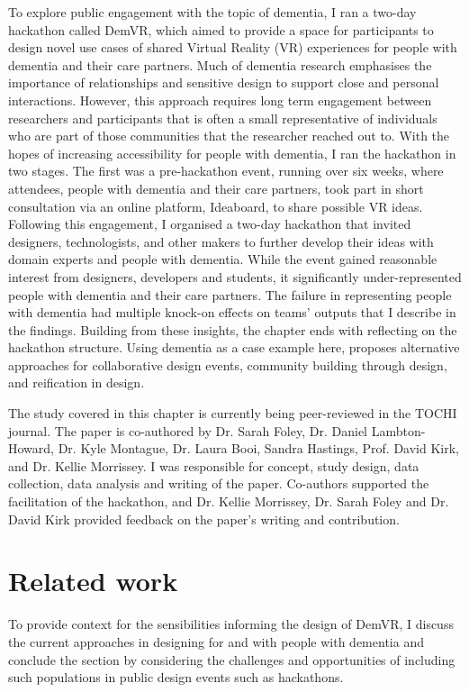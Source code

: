 To explore public engagement with the topic of dementia, I ran a two-day hackathon called DemVR, which aimed to provide a space for participants to design novel use cases of shared Virtual Reality (VR) experiences for people with dementia and their care partners. Much of dementia research emphasises the importance of relationships and sensitive design to support close and personal interactions. However, this approach requires long term engagement between researchers and participants that is often a small representative of individuals who are part of those communities that the researcher reached out to. With the hopes of increasing accessibility for people with dementia, I ran the hackathon in two stages. The first was a pre-hackathon event, running over six weeks, where attendees, people with dementia and their care partners, took part in short consultation via an online platform, Ideaboard, to share possible VR ideas. Following this engagement, I organised a two-day hackathon that invited designers, technologists, and other makers to further develop their ideas with domain experts and people with dementia. While the event gained reasonable interest from designers, developers and students, it significantly under-represented people with dementia and their care partners. The failure in representing people with dementia had multiple knock-on effects on teams' outputs that I describe in the findings. Building from these insights, the chapter ends with reflecting on the hackathon structure. Using dementia as a case example here, proposes alternative approaches for collaborative design events, community building through design, and reification in design.

The study covered in this chapter is currently being peer-reviewed in the TOCHI journal. The paper is co-authored by Dr. Sarah Foley, Dr. Daniel Lambton-Howard, Dr. Kyle Montague, Dr. Laura Booi, Sandra Hastings, Prof. David Kirk, and Dr. Kellie Morrissey. I was responsible for concept, study design, data collection, data analysis and writing of the paper. Co-authors supported the facilitation of the hackathon, and Dr. Kellie Morrissey, Dr. Sarah Foley and Dr. David Kirk provided feedback on the paper's writing and contribution.

\section{Related work}
\label{DemVR:RelatedWork}
To provide context for the sensibilities informing the design of DemVR, I discuss the current approaches in designing for and with people with dementia and conclude the section by considering the challenges and opportunities of including such populations in public design events such as hackathons.

